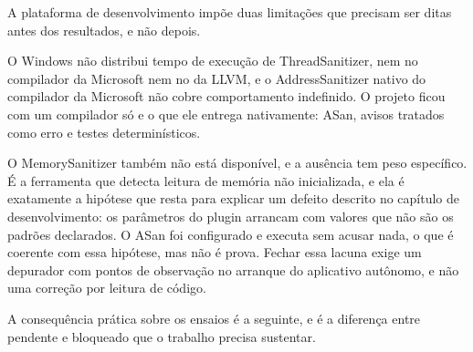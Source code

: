 \documentclass[12pt,a4paper]{article}
\begin{document}
A plataforma de desenvolvimento impõe duas limitações que precisam ser ditas antes dos resultados, e não depois.


O Windows não distribui tempo de execução de ThreadSanitizer, nem no compilador da Microsoft nem no da LLVM, e o AddressSanitizer nativo do compilador da Microsoft não cobre comportamento indefinido. O projeto ficou com um compilador só e o que ele entrega nativamente: ASan, avisos tratados como erro e testes determinísticos.


O MemorySanitizer também não está disponível, e a ausência tem peso específico. É a ferramenta que detecta leitura de memória não inicializada, e ela é exatamente a hipótese que resta para explicar um defeito descrito no capítulo de desenvolvimento: os parâmetros do plugin arrancam com valores que não são os padrões declarados. O ASan foi configurado e executa sem acusar nada, o que é coerente com essa hipótese, mas não é prova. Fechar essa lacuna exige um depurador com pontos de observação no arranque do aplicativo autônomo, e não uma correção por leitura de código.


A consequência prática sobre os ensaios é a seguinte, e é a diferença entre pendente e bloqueado que o trabalho precisa sustentar.
\end{document}
